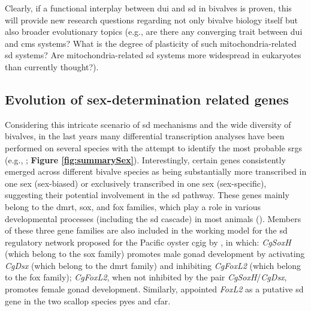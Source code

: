 \documentclass[../main.tex]{subfiles}
\begin{document}
Clearly, if a functional interplay between \gls{dui} and \gls{sd} in bivalves is proven, this will provide new research questions regarding not only bivalve biology itself but also broader evolutionary topics (e.g., are there any converging trait between \gls{dui} and \gls{cms} systems? What is the degree of plasticity of such mitochondria-related \gls{sd} systems? Are mitochondria-related \gls{sd} systems more widespread in eukaryotes than currently thought?).

\subsection{Evolution of sex-determination related genes}
Considering this intricate scenario of \gls{sd} mechanisms and the wide diversity of bivalves, in the last years many differential transcription analyses have been performed on several species with the attempt to identify the most probable \glspl{srg} (e.g., \textbf{\cite{milani2013nuclear,zhang2014genomic,chen2017transcriptome,capt2018deciphering,shi2018proteome}}; \textbf{Figure \ref{fig:summarySex}}). Interestingly, certain genes consistently emerged across different bivalve species as being substantially more transcribed in one sex (sex-biased) or exclusively transcribed in one sex (sex-specific), suggesting their potential involvement in the \gls{sd} pathway. These genes mainly belong to the \gls{dmrt}, \gls{sox}, and \gls{fox} families, which play a role in various developmental processes (including the \gls{sd} cascade) in most animals (\textbf{\cite{marshall2010homologies,bachtrog2014sex,beukeboom2014evolution}}). Members of these three gene families are also included in the working model for the \gls{sd} regulatory network proposed for the Pacific oyster \gls{cgig} by \textbf{\cite{zhang2014genomic}}, in which: \textit{CgSoxH} (which belong to the \gls{sox} family) promotes male gonad development by activating \textit{CgDsx} (which belong to the \gls{dmrt} family) and inhibiting \textit{CgFoxL2} (which belong to the \gls{fox} family); \textit{CgFoxL2}, when not inhibited by the pair \textit{CgSoxH}/\textit{CgDsx}, promotes female gonad development. Similarly, \textbf{\cite{han2022ancient}} appointed \textit{FoxL2} as a putative \gls{sd} gene in the two scallop species \gls{pyes} and \gls{cfar}. 
\end{document}
